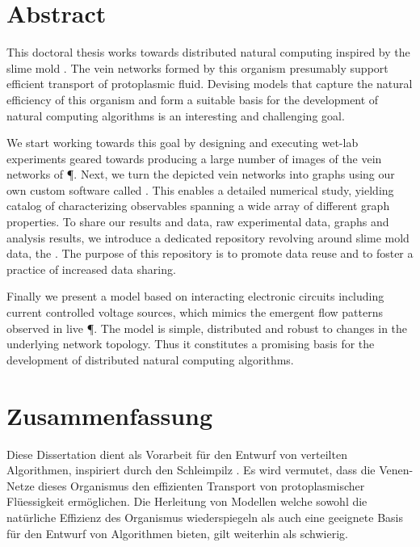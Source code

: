 \null\vfill

\section*{Abstract}
	
	This doctoral thesis works towards distributed natural computing inspired by the slime mold \Pp. The vein networks formed by this organism presumably support efficient transport of protoplasmic fluid. Devising models that capture the natural efficiency of this organism and form a suitable basis for the development of natural computing algorithms is an interesting and challenging goal.
	
	We start working towards this goal by designing and executing wet-lab experiments geared towards producing a large number of images of the vein networks of \P. Next, we turn the depicted vein networks into graphs using our own custom software called \NEFI. This enables a detailed numerical study, yielding catalog of characterizing observables spanning a wide array of different graph properties. To share our results and data, \ie raw experimental data, graphs and analysis results, we introduce a dedicated repository revolving around slime mold data, the \SMGR. The purpose of this repository is to promote data reuse and to foster a practice of increased data sharing. 

	Finally we present a model based on interacting electronic circuits including current controlled voltage sources, which mimics the emergent flow patterns observed in live \P. The model is simple, distributed and robust to changes in the underlying network topology. Thus it constitutes a promising basis for the development of distributed natural computing algorithms.

\vfill

\section*{Zusammenfassung}

	Diese Dissertation dient als Vorarbeit f\"ur den Entwurf von verteilten Algorithmen, inspiriert durch den Schleimpilz \Pp. Es wird vermutet, dass die Venen-Netze dieses Organismus den effizienten Transport von protoplasmischer Fl\"uessigkeit erm\"oglichen. Die Herleitung von Modellen welche sowohl die nat\"urliche Effizienz des Organismus wiederspiegeln als auch eine geeignete Basis f\"ur den Entwurf von Algorithmen bieten, gilt weiterhin als schwierig.

